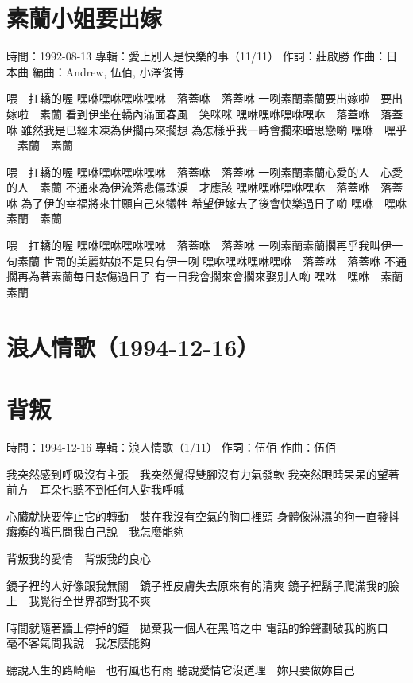 \documentclass[UTF8,a4paper,oneside,twocolumn,12pt]{ctexbook}
\newcommand{\infopair}[2]{\textbullet #1：#2}
\newcommand{\zc}[1][伍佰]{\infopair{作詞}{#1}}
\newcommand{\zq}[1][伍佰]{\infopair{作曲}{#1}}
\newcommand{\bq}[1][伍佰]{\infopair{編曲}{#1}}
\newcommand{\zj}[1]{\infopair{專輯}{#1}}
\newcommand{\sj}[1]{\infopair{時間}{#1}}
\newenvironment{info}{\begin{flushleft}\kaishu
	}
	{\end{flushleft}\normalsize\yahei\par}
\newenvironment{lyric}{
	}
{}
\begin{document}
\section{素蘭小姐要出嫁}
\begin{info}
	\sj{1992-08-13}
	\zj{愛上別人是快樂的事（11/11）}
	\zc[莊啟勝]
	\zq[日本曲]
	\bq[Andrew, 伍佰, 小澤俊博]
\end{info}
\begin{lyric}
	喂　扛轎的喔
	嘿咻嘿咻嘿咻嘿咻　落蓋咻　落蓋咻
	一咧素蘭素蘭要出嫁啦　要出嫁啦　素蘭
	看到伊坐在轎內滿面春風　笑咪咪
	嘿咻嘿咻嘿咻嘿咻　落蓋咻　落蓋咻
	雖然我是已經未凍為伊擱再來擱想
	為怎樣乎我一時會擱來暗思戀喲
	嘿咻　嘿乎 　素蘭　素蘭

	喂　扛轎的喔
	嘿咻嘿咻嘿咻嘿咻　落蓋咻　落蓋咻
	一咧素蘭素蘭心愛的人　心愛的人　素蘭
	不通來為伊流落悲傷珠淚　才應該
	嘿咻嘿咻嘿咻嘿咻　落蓋咻　落蓋咻
	為了伊的幸福將來甘願自己來犧牲
	希望伊嫁去了後會快樂過日子喲
	嘿咻　嘿咻　素蘭　素蘭

	喂　扛轎的喔
	嘿咻嘿咻嘿咻嘿咻　落蓋咻　落蓋咻
	一咧素蘭素蘭擱再乎我叫伊一句素蘭
	世間的美麗姑娘不是只有伊一咧
	嘿咻嘿咻嘿咻嘿咻　落蓋咻　落蓋咻
	不通擱再為著素蘭每日悲傷過日子
	有一日我會擱來會擱來娶別人喲
	嘿咻　嘿咻　素蘭　素蘭
\end{lyric}

\section*{浪人情歌（1994-12-16）}
\section{背叛}
\begin{info}
	\sj{1994-12-16}
	\zj{浪人情歌（1/11）}
	\zc
	\zq
\end{info}
\begin{lyric}
	我突然感到呼吸沒有主張　我突然覺得雙腳沒有力氣發軟
	我突然眼睛呆呆的望著前方　耳朵也聽不到任何人對我呼喊

	心臟就快要停止它的轉動　裝在我沒有空氣的胸口裡頭
	身體像淋濕的狗一直發抖　癱瘓的嘴巴問我自己說　我怎麼能夠

	背叛我的愛情　背叛我的良心

	鏡子裡的人好像跟我無關　鏡子裡皮膚失去原來有的清爽
	鏡子裡鬍子爬滿我的臉上　我覺得全世界都對我不爽

	時間就隨著牆上停掉的鐘　拋棄我一個人在黑暗之中
	電話的鈴聲劃破我的胸口　毫不客氣問我說　我怎麼能夠

	聽說人生的路崎嶇　也有風也有雨
	聽說愛情它沒道理　妳只要做妳自己

\end{lyric}
\end{document}
